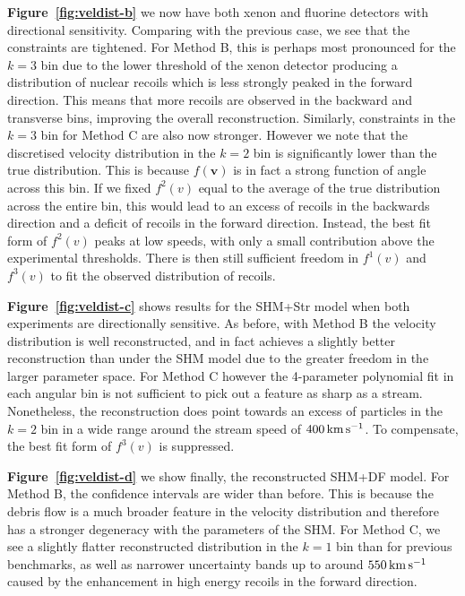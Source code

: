 {\bf Figure~\ref{fig:veldist-b}} we now have both xenon and fluorine detectors with directional sensitivity. Comparing with the previous case, we see that the constraints are tightened. For Method B, this is perhaps most pronounced for the $k = 3$ bin due to the lower threshold of the xenon detector producing a distribution of nuclear recoils which is less strongly peaked in the forward direction. This means that more recoils are observed in the backward and transverse bins, improving the overall reconstruction. Similarly, constraints in the $k=3$ bin for Method C are also now stronger. However we note that the discretised velocity distribution in the $k=2$ bin is significantly lower than the true distribution. This is because $f(\mathbf{v})$ is in fact a strong function of angle across this bin. If we fixed $f^2(v)$ equal to the average of the true distribution across the entire bin, this would lead to an excess of recoils in the backwards direction and a deficit of recoils in the forward direction. Instead, the best fit form of $f^2(v)$ peaks at low speeds, with only a small contribution above the experimental thresholds. There is then still sufficient freedom in $f^1(v)$ and $f^3(v)$ to fit the observed distribution of recoils. 

{\bf Figure~\ref{fig:veldist-c}} shows results for the SHM+Str model when both experiments are directionally sensitive. As before, with Method B the velocity distribution is well reconstructed, and in fact achieves a slightly better reconstruction than under the SHM model due to the greater freedom in the larger parameter space. For Method C however the 4-parameter polynomial fit in each angular bin is not sufficient to pick out a feature as sharp as a stream. Nonetheless, the reconstruction does point towards an excess of particles in the $k=2$ bin in a wide range around the stream speed of $400 \,{\rm km\,s^{-1}}$. To compensate, the best fit form of $f^3(v)$ is suppressed.

{\bf Figure~\ref{fig:veldist-d}} we show finally, the reconstructed SHM+DF model. For Method B, the confidence intervals are wider than before. This is because the debris flow is a much broader feature in the velocity distribution and therefore has a stronger degeneracy with the parameters of the SHM. For Method C, we see a slightly flatter reconstructed distribution in the $k=1$ bin than for previous benchmarks, as well as narrower uncertainty bands up to around $550 \,{\rm km\,s^{-1}}$ caused by the enhancement in high energy recoils in the forward direction.

